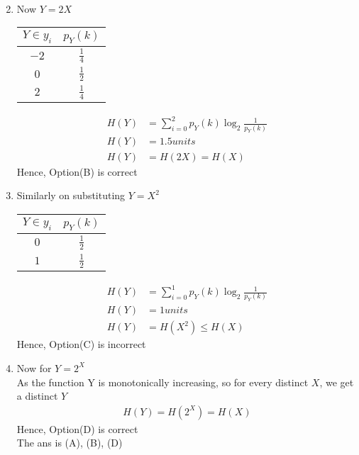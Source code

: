 \documentclass[journal,12pt,onecolumn]{IEEEtran}
\theoremstyle{remark}
\begin{document}
\begin{enumerate}
\begin{align}
 \end{align}
\item Now $ Y = 2X$
 \begin{table}[htpb]
\centering 
\begin{tabular}{|c|c|}
\hline
$Y \in y_i$	&          $p_Y(k)$\\
\hline
$-2$                         & $\frac{1}{4} $       \\
\hline
$0$                         & $\frac{1}{2} $ \\
\hline
$2$                         & $\frac{1}{4}$ \\
\hline
\end{tabular}
\end{table}
\begin{align}
H(Y) &= \sum_{i=0}^{2}p_Y(k) \log _{2} \frac{1}{p_Y(k)}\\
H(Y) &=  1.5 units\\
  H(Y) &= H(2X) =H(X)
 \end{align}
 Hence, Option(B) is correct\\
 \item Similarly on substituting $Y = X^2$\\
  \begin{table}[htpb]
\centering 
\begin{tabular}{|c|c|}
\hline
$Y \in y_i$	&	$p_Y(k)$\\
\hline
$0$                         & $\frac{1}{2} $       \\
\hline
$1$                         & $\frac{1}{2} $ \\
\hline
\end{tabular}
\end{table}
 \begin{align}
H(Y) &= \sum_{i=0}^{1}p_Y(k) \log _{2} \frac{1}{p_Y(k)}\\
H(Y) &=  1units\\
  H(Y) &= H(X^2) \leq H(X)
 \end{align}
 Hence, Option(C) is incorrect\\
 \item Now for $Y = 2^X$\\
 As the function Y is monotonically increasing, so for every distinct $X$, we get a distinct $Y$ 
 \begin{align}
  H(Y) = H(2^X) =  H(X) 
 \end{align}
 Hence, Option(D) is correct\\
 The ans is (A), (B), (D)
 \end{enumerate}
\end{document}
